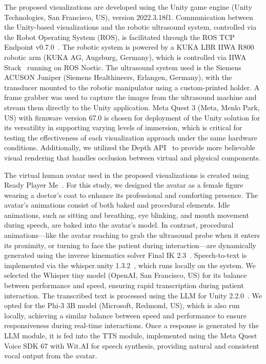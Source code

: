 The proposed visualizations are developed using the Unity game engine (Unity Technologies, San Francisco, US), version 2022.3.18f1. Communication between the Unity-based visualizations and the robotic ultrasound system, controlled via the Robot Operating System (ROS), is facilitated through the ROS TCP Endpoint v0.7.0~\cite{unity2022rostcp}. The robotic system is powered by a KUKA LBR IIWA R800 robotic arm (KUKA AG, Augsburg, Germany), which is controlled via IIWA Stack~\cite{hennersperger2017towards} running on ROS Noetic. The ultrasound system used is the Siemens ACUSON Juniper (Siemens Healthineers, Erlangen, Germany), with the transducer mounted to the robotic manipulator using a custom-printed holder. A frame grabber was used to capture the images from the ultrasound machine and stream them directly to the Unity application. Meta Quest 3 (Meta, Menlo Park, US) with firmware version 67.0 is chosen for deployment of the Unity solution for its versatility in supporting varying levels of immersion, which is critical for testing the effectiveness of each visualization approach under the same hardware conditions. Additionally, we utilized the Depth API~\cite{depthapi} to provide more believable visual rendering that handles occlusion between virtual and physical components. 

The virtual human avatar used in the proposed visualizations is created using Ready Player Me~\cite{readyplayerme}. For this study, we designed the avatar as a female figure wearing a doctor’s coat to enhance its professional and comforting presence. The avatar’s animations consist of both baked and procedural elements. Idle animations, such as sitting and breathing, eye blinking, and mouth movement during speech, are baked into the avatar’s model. In contrast, procedural animations—like the avatar reaching to grab the ultrasound probe when it enters its proximity, or turning to face the patient during interaction—are dynamically generated using the inverse kinematics solver Final IK 2.3~\cite{finalik}.
Speech-to-text is implemented via the whisper.unity 1.3.2~\cite{whisperunity}, which runs locally on the system. We selected the Whisper tiny model (OpenAI, San Francisco, US) for its balance between performance and speed, ensuring rapid transcription during patient interaction. The transcribed text is processed using the LLM for Unity 2.2.0~\cite{llmunity}. We opted for the Phi-3 3B model (Microsoft, Redmond, US), which is also run locally, achieving a similar balance between speed and performance to ensure responsiveness during real-time interactions. Once a response is generated by the LLM module, it is fed into the TTS module, implemented using the Meta Quest Voice SDK 67 with Wit.AI for speech synthesis, providing natural and consistent vocal output from the avatar.

